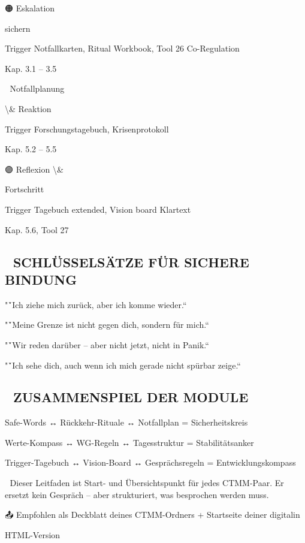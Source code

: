 🟠 Eskalation

sichern

Trigger Notfallkarten, Ritual Workbook, Tool 26 Co-Regulation

Kap. 3.1 -- 3.5

🔴 Notfallplanung

\textbackslash{}& Reaktion

Trigger Forschungstagebuch, Krisenprotokoll

Kap. 5.2 -- 5.5

🟣 Reflexion \textbackslash{}&

Fortschritt

Trigger Tagebuch extended, Vision board Klartext

Kap. 5.6, Tool 27

\subsection{💬 SCHLÜSSELSÄTZE FÜR SICHERE BINDUNG}

"\'`Ich ziehe mich zurück, aber ich komme wieder.“

"\'`Meine Grenze ist nicht gegen dich, sondern für mich.“

"\'`Wir reden darüber -- aber nicht jetzt, nicht in Panik.“

"\'`Ich sehe dich, auch wenn ich mich gerade nicht spürbar zeige.“

\subsection{🔗 ZUSAMMENSPIEL DER MODULE}

Safe-Words ↔ Rückkehr-Rituale ↔ Notfallplan = Sicherheitskreis

Werte-Kompass ↔ WG-Regeln ↔ Tagesstruktur = Stabilitätsanker

Trigger-Tagebuch ↔ Vision-Board ↔ Gesprächsregeln = Entwicklungskompass

📎 Dieser Leitfaden ist Start- und Übersichtspunkt für jedes CTMM-Paar. Er ersetzt kein Gespräch -- aber strukturiert, was besprochen werden muss.

📤 Empfohlen als Deckblatt deines CTMM-Ordners + Startseite deiner digitalin

HTML-Version
